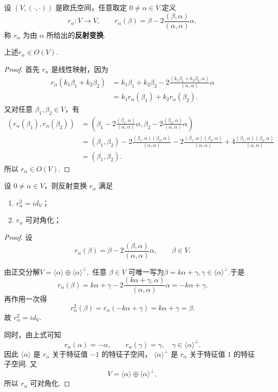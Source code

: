 \begin{definition}\label{p1:concept:c6-l809}
	设 $(V,(\cdot,\cdot))$ 是欧氏空间，任意取定 $0\ne\alpha\in V$.定义
	\[
	r_{\alpha}:V\longrightarrow V,
	\qquad
	r_{\alpha}(\beta)=\beta-2\frac{(\beta,\alpha)}{(\alpha,\alpha)}\alpha,
	\]
	 称 $r_{\alpha}$ 为由 $\alpha$ 所给出的\textbf{反射变换}.
\end{definition}
\begin{proposition}
	上述$r_{\alpha}\in O(V)$.
\end{proposition}
\begin{proof}
	首先 $r_{\alpha}$ 是线性映射，因为
	\[
	\begin{aligned}
		r_{\alpha}(k_1\beta_1+k_2\beta_2)
		&=k_1\beta_1+k_2\beta_2
		-2\frac{(k_1\beta_1+k_2\beta_2,\alpha)}{(\alpha,\alpha)}\alpha \\
		&=k_1r_{\alpha}(\beta_1)+k_2r_{\alpha}(\beta_2).
	\end{aligned}
	\]
	又对任意 $\beta_1,\beta_2\in V$，有
	\[
	\begin{aligned}
		(r_\alpha(\beta_1),r_\alpha(\beta_2))
		&=\left(\beta_1-2\frac{(\beta_1,\alpha)}{(\alpha,\alpha)}\alpha,
		\beta_2-2\frac{(\beta_2,\alpha)}{(\alpha,\alpha)}\alpha\right)\\
		&=(\beta_1,\beta_2)-2\frac{(\beta_1,\alpha)(\beta_2,\alpha)}{(\alpha,\alpha)}
		-2\frac{(\beta_1,\alpha)(\beta_2,\alpha)}{(\alpha,\alpha)}
		+4\frac{(\beta_1,\alpha)(\beta_2,\alpha)}{(\alpha,\alpha)}\\
		&=(\beta_1,\beta_2).
	\end{aligned}
	\]
	所以 $r_\alpha\in O(V)$.
\end{proof}

\begin{proposition}
	设 $0\ne\alpha\in V$，则反射变换 $r_\alpha$ 满足
	\begin{enumerate}
		\item $r_\alpha^2=id_V$；
		\item $r_\alpha$ 可对角化；
	\end{enumerate}
\end{proposition}
\begin{proof}
	设
	\[r_\alpha(\beta)
	=
	\beta-2\frac{(\beta,\alpha)}{(\alpha,\alpha)}\alpha,
	\qquad \beta\in V.\]

	由正交分解$ V=\langle \alpha\rangle\oplus \langle \alpha\rangle^\perp,$
	任意 $\beta\in V$ 可唯一写为$\beta=k\alpha+\gamma,\gamma\in \langle \alpha\rangle^\perp. $于是
	\[	r_\alpha(\beta)
	=
	k\alpha+\gamma-2\frac{(k\alpha+\gamma,\alpha)}{(\alpha,\alpha)}\alpha
	=
	-k\alpha+\gamma.\]
再作用一次得
\[r_\alpha^2(\beta)=r_\alpha(-k\alpha+\gamma)=k\alpha+\gamma=\beta.\]
	故 $r_\alpha^2=id_V$.
	
同时，由上式可知
	\[
	r_\alpha(\alpha)=-\alpha,
	\qquad
	r_\alpha(\gamma)=\gamma,\quad \gamma\in \langle \alpha\rangle^\perp.
	\]
	因此 $\langle \alpha\rangle$ 是 $r_\alpha$ 关于特征值 $-1$ 的特征子空间，
	$\langle \alpha\rangle^\perp$ 是 $r_\alpha$ 关于特征值 $1$ 的特征子空间.
	又
	\[
	V=\langle \alpha\rangle\oplus \langle \alpha\rangle^\perp,
	\]
	所以 $r_\alpha$ 可对角化.
	
	
	
\end{proof}


